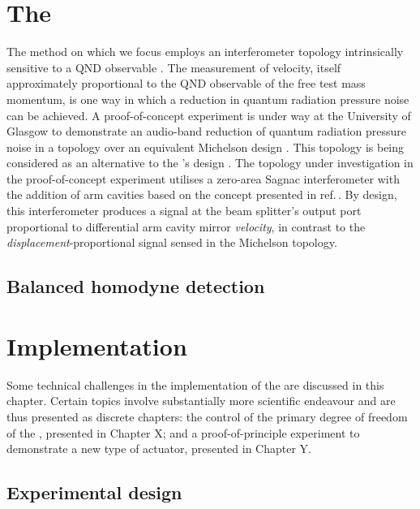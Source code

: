 \section{The \SSMEXPT{}}
The method on which we focus employs an interferometer topology intrinsically sensitive to a \gls{QND} observable \cite{Danilishin2012}. The measurement of velocity, itself approximately proportional to the \gls{QND} observable of the free test mass momentum, is one way in which a reduction in quantum radiation pressure noise can be achieved. A proof-of-concept experiment is under way at the University of Glasgow to demonstrate an audio-band reduction of quantum radiation pressure noise in a \SSM{} topology over an equivalent Michelson design \cite{Graef2014}. This topology is being considered as an alternative to the \ET{}'s \MI{} design \cite{MuellerEbhardt2009a, Voronchev2015}. The topology under investigation in the proof-of-concept experiment utilises a zero-area Sagnac interferometer with the addition of arm cavities based on the concept presented in ref.\,\cite{Chen2003}. By design, this interferometer produces a signal at the beam splitter's output port proportional to differential arm cavity mirror \emph{velocity}, in contrast to the \emph{displacement}-proportional signal sensed in the Michelson topology.

\subsection{\label{sec:bhd-intro}Balanced homodyne detection}

\section{Implementation}

Some technical challenges in the implementation of the \SM{} are discussed in this chapter. Certain topics involve substantially more scientific endeavour and are thus presented as discrete chapters: the control of the primary degree of freedom of the \SM{}, presented in Chapter X; and a proof-of-principle experiment to demonstrate a new type of actuator, presented in Chapter Y.

\subsection{Experimental design}

